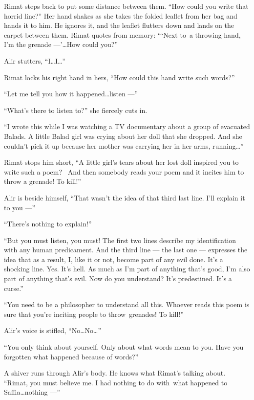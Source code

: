 \documentclass[twoside,11pt]{book}
\begin{document}
Rimat steps back to put some distance between them. ``How could you write that horrid line?''
Her hand shakes as she takes the folded leaflet from her bag and hands it to him. He ignores it, and the leaflet
flutters down and lands on the carpet between them. Rimat quotes from memory:
``{\thinspace}`Next to~a throwing hand,
I'm the grenade ---'{\ldots}How could you?''

Alir stutters, ``I{\ldots}I{\ldots}''

Rimat locks his right hand in hers, ``How could this hand write such words?''

``Let me tell you how it happened{\ldots}listen ---''

``What's there to listen to?'' she fiercely cuts in.

``I wrote this while I was watching a TV documentary about a group of evacuated Balads. A little Balad girl
was crying about her doll that she dropped. And she couldn't pick it up because her mother was carrying her in her
arms, running{\ldots}''

Rimat stops him short, ``A little girl's tears about her lost doll inspired you to write such a poem?~ And
then somebody reads your poem and it incites him to throw a grenade! To kill!''

Alir is beside himself, ``That wasn't the idea of that third last line. I'll explain it to you ---''

``There's nothing to explain!''

``But you must listen, you must! The first two lines describe my identification with any human predicament.
And the third line --- the last one --- expresses the idea that as a result, I, like it or not, become part of any evil
done. It's a shocking line. Yes. It's hell. As much as I'm part of anything that's good, I'm also part of anything
that's evil. Now do you understand? It's predestined. It's a curse.''

``You need to be a philosopher to understand all this. Whoever reads this poem is sure that you're inciting
people to throw~grenades! To kill!''

Alir's voice is stifled, ``No{\ldots}No{\ldots}''

``You only think about yourself. Only about what words mean to you. Have you forgotten what happened
because of words?''

A shiver runs through Alir's body. He knows what Rimat's talking about. ``Rimat, you must believe me. I
had nothing to do with~what happened to Saffia{\ldots}nothing ---''
\end{document}

